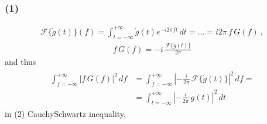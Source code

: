 \documentclass[letterpaper,10pt,english]{jupyterBook}
\begin{document}
\subsubsection*{(1)}
\begin{equation*}
\begin{split}\mathscr{F}\{ \dot{g}(t) \}(f) = \int_{t=-\infty}^{+\infty} \dot{g}(t) e^{-i 2 \pi f t} \, dt = \dots = i 2 \pi \, f \, G(f) \ , \end{split}
\end{equation*}\begin{equation*}
\begin{split}f \, G(f) = -i \, \frac{\mathscr{F}\{ \dot{g}(t) \}}{2 \pi}\end{split}
\end{equation*}
\sphinxAtStartPar
and thus {\hyperref[\detokenize{ch/complex/fourier-transform:complex-fourier-transform-plancherel}]{}}
\begin{equation*}
\begin{split}\begin{aligned}
 \int_{f=-\infty}^{+\infty} | f \, G(f) |^2 \, df
 & = \int_{f=-\infty}^{+\infty} \left|  -\frac{i}{2 \pi} \, \mathscr{F}\{ \dot{g}(t) \} \right|^2 \, df = \\
 & = \int_{t=-\infty}^{+\infty} \left|  -\frac{i}{2 \pi} \, \dot{g}(t) \right|^2 \, dt
\end{aligned}\end{split}
\end{equation*}
\sphinxAtStartPar
in (2) Cauchy\sphinxhyphen{}Schwartz inequality,
\end{document}
